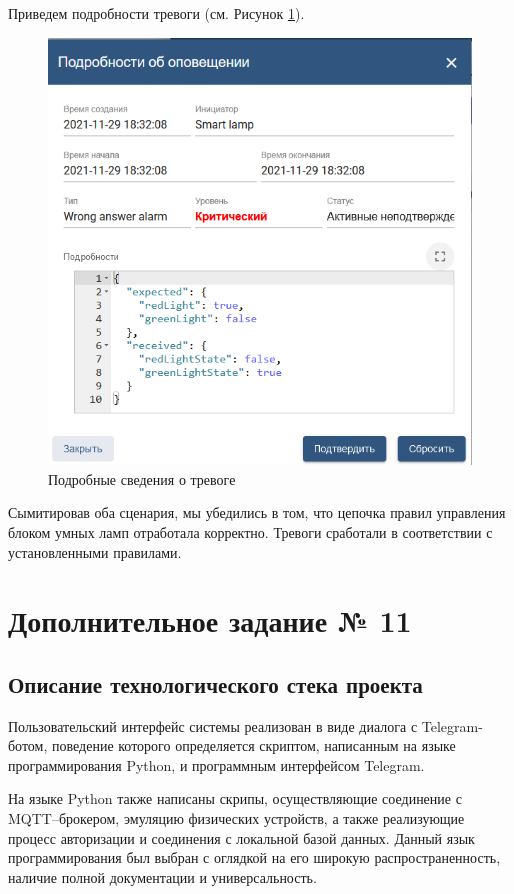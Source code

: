 \documentclass[a4paper,14pt]{extarticle}
\begin{document}
Приведем подробности тревоги (см. Рисунок \ref{fig:t2-alarm-wrong-response-detail}).
\begin{figure}[h!]
	\centering
	\includegraphics[width=0.7\linewidth]{images/t2-alarm-wrong-response-detail}
	\caption{Подробные сведения о тревоге}
	\label{fig:t2-alarm-wrong-response-detail}
\end{figure}

Сымитировав оба сценария, мы убедились в том, что цепочка правил управления блоком умных ламп отработала корректно. Тревоги сработали в соответствии с установленными правилами.

\section{Дополнительное задание № 11}

\subsection{Описание технологического стека проекта}

Пользовательский интерфейс системы реализован в виде диалога с Telegram-ботом, поведение которого определяется скриптом, написанным на языке программирования Python, и программным интерфейсом Telegram. 

На языке Python также написаны скрипы, осуществляющие соединение с \mbox{MQTT--брокером}, эмуляцию физических устройств, а также реализующие процесс авторизации и соединения с локальной базой данных. Данный язык программирования был выбран с оглядкой на его широкую распространенность, наличие полной документации и универсальность.
\end{document}
